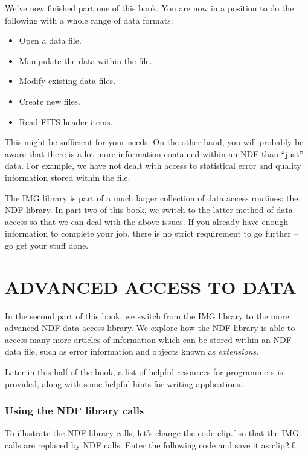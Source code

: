 We've now finished part one of this book. You are now in a position
to do the following with a whole range of data formats:

\begin{itemize}
\item Open a data file.
\item Manipulate the data within the file.
\item Modify existing data files.
\item Create new files.
\item Read FITS header items.
\end{itemize}

This might be sufficient for your needs. On the other hand, you will
probably be aware that there is a lot more information contained within an
NDF than ``just'' data. For example, we have not dealt with access to
statistical error and quality information stored within the file.

The IMG library is part of a much larger collection of data access routines:
the NDF library. In part two of this book, we switch to the latter method
of data access so that we can deal with the above issues. If you already have
enough information to complete your job, there is no strict requirement
to go further -- go get your stuff done.

\newpage

\part{ADVANCED ACCESS TO DATA}

\markright{\stardocname}

In the second part of this book, we switch from the IMG library to the
more advanced NDF data access library. We explore how the NDF library
is able to access many more articles of information which can be
stored within an NDF data file, such as error information and
objects known as {\em extensions}.

Later in this half of the book, a list of helpful resources for
programmers is provided, along with some helpful hints for
writing applications.

\newpage

\section{Using the NDF library calls}

To illustrate the NDF library calls, let's change the code {\sf clip.f} so
that the {\sf IMG} calls are replaced by {\sf NDF} calls. Enter the
following code and save it as {\sf clip2.f}.

